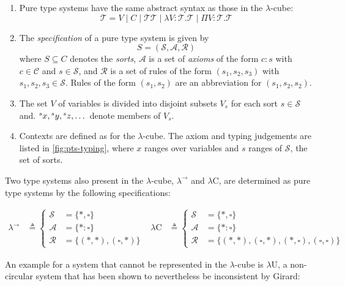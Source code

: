 \documentclass[12pt,toc=bibliography,numbers=noendperiod,
               footnotes=multiple,twoside]{scrartcl}
\begin{document}
\begin{enumerate}
\item Pure type systems have the same abstract syntax as those in the \(\lambda\)-cube: \[\mathcal{T} = V \;|\; C \;|\; \mathcal{T}\mathcal{T} \;|\; \lambda V\!\!:\!\mathcal{T}\!.\mathcal{T} \;|\; \Pi V\!\!:\!\mathcal{T}\!.\mathcal{T}\]
\item The \emph{specification} of a pure type system is given by \[S = (\mathcal{S}, \mathcal{A}, \mathcal{R})\] where \(S \subseteq C\) denotes the \emph{sorts}, \(\mathcal{A}\) is a set of \emph{axioms} of the form \(c:s\) with \(c \in \mathcal{C}\) and \(s \in \mathcal{S}\), and \(\mathcal{R}\) is a set of rules of the form \((s_1, s_2, s_3)\) with \(s_1, s_2, s_3 \in \mathcal{S}\). Rules of the form \((s_1, s_2)\) are an abbreviation for \((s_1, s_2, s_2)\).
\item The set \(V\) of variables is divided into disjoint subsets \(V_s\) for each sort \(s \in \mathcal{S}\) and. \(\prescript{s}{}x, \prescript{s}{}y, \prescript{s}{}z, \dots\) denote members of \(V_s\).
\item Contexts are defined as for the \(\lambda\)-cube. The axiom and typing judgements are listed in \cref{fig:pts-typing}, where \(x\) ranges over variables and \(s\) ranges of \(\mathcal{S}\), the set of sorts.
\end{enumerate}

Two type systems also present in the \(\lambda\)-cube, \(\lambda^{\rightarrow}\) and \(\lambda\textrm{C}\), are determined as pure type systems by the following specifications:

\begin{align*}
\lambda^{\rightarrow} &\triangleq
    \begin{cases}
        \mathcal{S} &= \{*,\square\} \\
        \mathcal{A} &= \{*:\square\} \\
        \mathcal{R} &= \{(*,*),(\square,*)\}
    \end{cases} &
\lambda\textrm{C} &\triangleq
    \begin{cases}
        \mathcal{S} &= \{*,\square\} \\
        \mathcal{A} &= \{*:\square\} \\
        \mathcal{R} &= \{(*,*),(\square,*),(*,\square),(\square,\square)\}
    \end{cases}
\end{align*}

An example for a system that cannot be represented in the \(\lambda\)-cube is \(\lambda\textrm{U}\), a non-circular system that has been shown to nevertheless be inconsistent by Girard:
\end{document}
